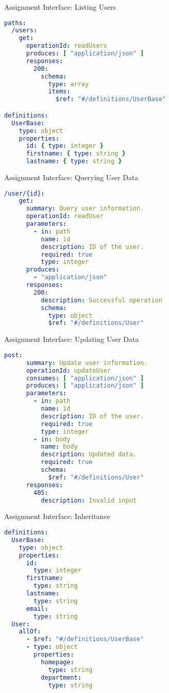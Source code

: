 \begin{frame}[fragile]{Assignment Interface: Listing Users}
\begin{lstlisting}[language=yaml,style=mini]
paths:
  /users:
    get:
      operationId: readUsers
      produces: [ "application/json" ]
      responses:
        200:
          schema:
            type: array
            items:
              $ref: "#/definitions/UserBase"

definitions:
  UserBase:
    type: object
    properties:
      id: { type: integer }
      firstname: { type: string }
      lastname: { type: string }
\end{lstlisting}
\end{frame}


\begin{frame}[fragile]{Assignment Interface: Querying User Data}
\begin{lstlisting}[language=yaml,style=mini]
  /user/{id}:
    get:
      summary: Query user information.
      operationId: readUser
      parameters:
        - in: path
          name: id
          description: ID of the user.
          required: true
          type: integer
      produces:
        - "application/json"
      responses:
        200:
          description: Successful operation
          schema:
            type: object
            $ref: "#/definitions/User"
\end{lstlisting}
\end{frame}


\begin{frame}[fragile]{Assignment Interface: Updating User Data}
\begin{lstlisting}[language=yaml,style=mini]
    post:
      summary: Update user information.
      operationId: updateUser
      consumes: [ "application/json" ]
      produces: [ "application/json" ]
      parameters:
        - in: path
          name: id
          description: ID of the user.
          required: true
          type: integer
        - in: body
          name: body
          description: Updated data.
          required: true
          schema:
            $ref: "#/definitions/User"
      responses:
        405:
          description: Invalid input
\end{lstlisting}
\end{frame}


\begin{frame}[fragile]{Assignment Interface: Inheritance}
\begin{lstlisting}[language=yaml,style=mini]
definitions:
  UserBase:
    type: object
    properties:
      id:
        type: integer
      firstname:
        type: string
      lastname:
        type: string
      email:
        type: string
  User:
    allOf:
      - $ref: "#/definitions/UserBase"
      - type: object
        properties:
          homepage:
            type: string
          department:
            type: string
\end{lstlisting}
\end{frame}



